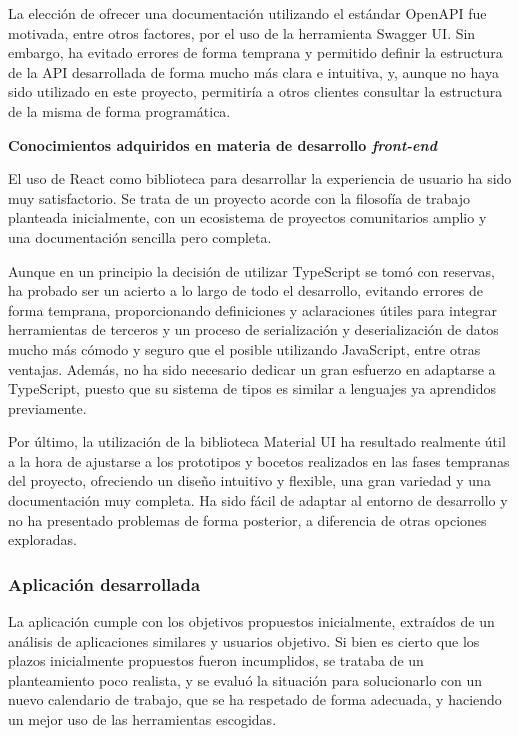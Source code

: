 \documentclass[10pt, a4paper]{aqademic}
\begin{document}
La elección de ofrecer una documentación utilizando el estándar OpenAPI fue motivada, entre otros factores, por el uso de la herramienta Swagger UI. Sin embargo, ha evitado errores de forma temprana y permitido definir la estructura de la API desarrollada de forma mucho más clara e intuitiva, y, aunque no haya sido utilizado en este proyecto, permitiría a otros clientes consultar la estructura de la misma de forma programática.

\bigskip

\textbf{Conocimientos adquiridos en materia de desarrollo \textit{front-end}}

El uso de React como biblioteca para desarrollar la experiencia de usuario ha sido muy satisfactorio. Se trata de un proyecto acorde con la filosofía de trabajo planteada inicialmente, con un ecosistema de proyectos comunitarios amplio y una documentación sencilla pero completa.

Aunque en un principio la decisión de utilizar TypeScript se tomó con reservas, ha probado ser un acierto a lo largo de todo el desarrollo, evitando errores de forma temprana, proporcionando definiciones y aclaraciones útiles para integrar herramientas de terceros y un proceso de serialización y deserialización de datos mucho más cómodo y seguro que el posible utilizando JavaScript, entre otras ventajas. Además, no ha sido necesario dedicar un gran esfuerzo en adaptarse a TypeScript, puesto que su sistema de tipos es similar a lenguajes ya aprendidos previamente. 

Por último, la utilización de la biblioteca Material UI ha resultado realmente útil a la hora de ajustarse a los prototipos y bocetos realizados en las fases tempranas del proyecto, ofreciendo un diseño intuitivo y flexible, una gran variedad y una documentación muy completa. Ha sido fácil de adaptar al entorno de desarrollo y no ha presentado problemas de forma posterior, a diferencia de otras opciones exploradas.


\subsubsection{Aplicación desarrollada}

La aplicación cumple con los objetivos propuestos inicialmente, extraídos de un análisis de aplicaciones similares y usuarios objetivo. Si bien es cierto que los plazos inicialmente propuestos fueron incumplidos, se trataba de un planteamiento poco realista, y se evaluó la situación para solucionarlo con un nuevo calendario de trabajo, que se ha respetado de forma adecuada, y haciendo un mejor uso de las herramientas escogidas.
\end{document}
